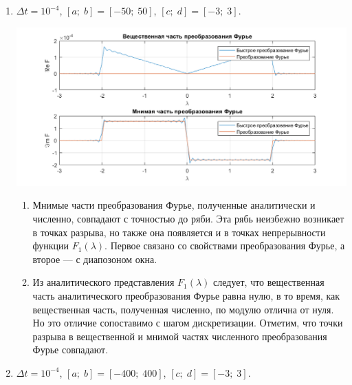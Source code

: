 \documentclass[a4paper, 11pt]{article}
\begin{document}
    \begin{enumerate}
        \item
            $\Delta t = 10^{-4}$, $[a;\; b] = [-50;\; 50]$, $[c;\;d] = [-3;\;3]$.
            
            \includegraphics[width=\linewidth]{img/1.png}
            
            \begin{enumerate}
                \item
                    Мнимые части преобразования Фурье, полученные аналитически и численно, совпадают с точностью до ряби. Эта рябь неизбежно возникает в точках разрыва, но также она появляется и в точках непрерывности функции $F_1(\lambda)$. Первое связано со свойствами преобразования Фурье, а второе --- с диапозоном окна.
                \item
                     Из аналитического представления $F_1(\lambda)$ следует, что вещественная часть аналитического преобразования Фурье равна нулю, в то время, как вещественная часть, полученная численно, по модулю отлична от нуля. Но это отличие сопоставимо с шагом дискретизации. Отметим, что точки разрыва в вещественной и мнимой частях численного преобразования Фурье совпадают. 
            \end{enumerate}
        \item
              $\Delta t = 10^{-4}$, $[a;\; b] = [-400;\; 400]$, $[c;\;d] = [-3;\;3]$.             
              

\end{enumerate}
\end{document}
